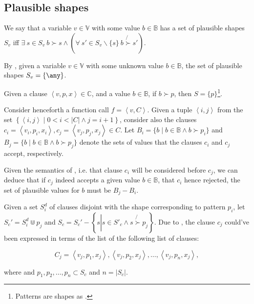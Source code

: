 \subsection{Plausible shapes}

\begin{definition} We say that a variable $v\in\mathbb{V}$ with some value
$b\in\mathbb{B}$ has a set of plausible shapes $S_v$ iff $\exists\ s\in S_v\
b\succ s \wedge \left( \forall\ s'\in S_v\backslash\{s\}\ b \not{\succ} s'
\right)$.\end{definition}

\begin{corollary} By , given a variable
$v\in\mathbb{V}$ with some unknown value $b\in\mathbb{B}$, the set of plausible
shapes $S_v=\{\any\}$.\end{corollary}

\begin{corollary} Given a clause $\left\langle v,p,x
\right\rangle\in\mathbb{C}$, and a value $b\in\mathbb{B}$, if $b\succ p$, then
$S=\{p\}$\footnote{Patterns are shapes as
.}.\end{corollary}


Consider henceforth a function call $f = \left\langle v, C \right\rangle$.
Given a tuple $\left\langle i,j \right\rangle$ from the set $\left\{
\left\langle i, j \right\rangle \mid 0 < i < |C| \wedge j = i + 1 \right\}$,
consider also the clauses $c_i = \left\langle v_i, p_i, x_i \right\rangle, c_j
= \left\langle v_j, p_j, x_j \right\rangle \in C$. Let $B_i=\{b\mid
b\in\mathbb{B} \wedge b \succ p_i\}$ and $B_j=\{b\mid b\in\mathbb{B} \wedge b
\succ p_j\}$ denote the sets of values that the clauses $c_i$ and $c_j$ accept,
respectively.

\begin{corollary}\label{corollary:nice-1} Given the semantics of \D{}, i.e.
that clause $c_i$ will be considered before $c_j$, we can deduce that if $c_j$
indeed accepts a given value $b\in\mathbb{B}$, that $c_i$ hence rejected, the
set of plausible values for $b$ must be $B_j-B_i$.\end{corollary}

\begin{corollary}\label{corollary:nice-2} Given a set $S^d_i$ of clauses
disjoint with the shape corresponding to pattern $p_i$, let $S_c'=S^d_i\Cup
p_j$ and $S_c=S_c'-\left\{ s \left| s\in S'_c \wedge s\not{\succ} p_j
\right.\right\}$. Due to \referToCorollary{nice-1}, the clause $c_j$ could've
been expressed in terms of the list of the following list of clauses:  

$$C_j = \left\langle v_j,p_1, x_j \right\rangle, \left\langle v_j, p_2, x_j
\right\rangle, \ldots, \left\langle v_j, p_n, x_j \right\rangle,$$

where and $p_1,p_2,\ldots,p_n\subset S_c$ and $n=|S_c|$.\end{corollary}

